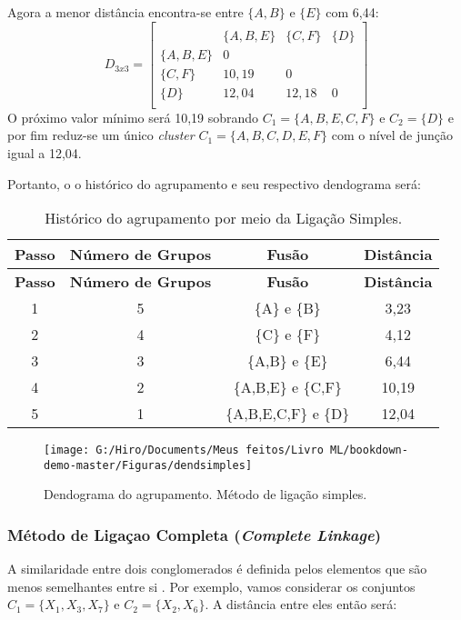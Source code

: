 \documentclass[
  openany]{book}
\begin{document}
Agora a menor distância encontra-se entre \(\{A,B\}\) e \(\{E\}\) com 6,44:
\[D_{3x3}=\begin{bmatrix}\\
 &\{A,B,E\}& \{C,F\}&\{D\} \\
 \{A,B,E\}&0&\\
 \{C,F\} & 10,19&0&\\
 \{D\}& 12,04& 12,18&0\\
\end{bmatrix}\]
O próximo valor mínimo será 10,19 sobrando \(C_1=\{A,B,E,C,F\}\) e \(C_2=\{D\}\) e por fim reduz-se um único \emph{cluster} \(C_1=\{A,B,C,D,E,F\}\) com o nível de junção igual a 12,04.

Portanto, o o histórico do agrupamento e seu respectivo dendograma será:

\begin{longtable}[]{@{}cccc@{}}
\caption{\label{tab:ligsimple} Histórico do agrupamento por meio da Ligação Simples.}\tabularnewline
\toprule
\textbf{Passo} & \textbf{Número de Grupos} & \textbf{Fusão} & \textbf{Distância}\tabularnewline
\midrule
\endfirsthead
\toprule
\textbf{Passo} & \textbf{Número de Grupos} & \textbf{Fusão} & \textbf{Distância}\tabularnewline
\midrule
\endhead
1 & 5 & \{A\} e \{B\} & 3,23\tabularnewline
2 & 4 & \{C\} e \{F\} & 4,12\tabularnewline
3 & 3 & \{A,B\} e \{E\} & 6,44\tabularnewline
4 & 2 & \{A,B,E\} e \{C,F\} & 10,19\tabularnewline
5 & 1 & \{A,B,E,C,F\} e \{D\} & 12,04\tabularnewline
\bottomrule
\end{longtable}

\begin{figure}

{\centering \texttt{[image: G:/Hiro/Documents/Meus feitos/Livro ML/bookdown-demo-master/Figuras/dendsimples]} 

}

\caption{Dendograma do agrupamento. Método de ligação simples.}\label{fig:dendsimples}
\end{figure}



\hypertarget{muxe9todo-de-ligauxe7ao-completa-complete-linkage}{%
\subsubsection{\texorpdfstring{Método de Ligaçao Completa (\emph{Complete Linkage})}{Método de Ligaçao Completa (Complete Linkage)}}\label{muxe9todo-de-ligauxe7ao-completa-complete-linkage}}

A similaridade entre dois conglomerados é definida pelos elementos que são menos semelhantes entre si \citep{sneath1957application}. Por exemplo, vamos considerar os conjuntos \(C_1=\{X_1,X_3,X_7\}\) e \(C_2=\{X_2,X_6\}\). A distância entre eles então será:
\end{document}
